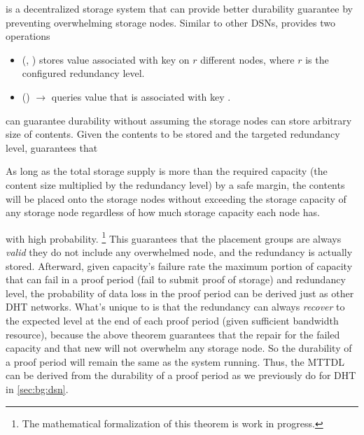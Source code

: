 \iffalse
\dht is a decentralized storage system that can provide better durability guarantee by preventing overwhelming storage nodes.
Similar to other DSNs, \dht provides two operations
\begin{itemize}
    \item \fput(, ) stores value  associated with key  on $r$ different nodes, where $r$ is the configured redundancy level.
    \item \fget() $\to$  queries value that is associated with key .
\end{itemize}
\noindent \dht can guarantee durability without assuming the storage nodes can store arbitrary size of contents.
Given the contents to be stored and the targeted redundancy level, \dht guarantees that
\begin{theorem}
    As long as the total storage supply is more than the required capacity (\ie the content size multiplied by the redundancy level) by a safe margin, the contents will be placed onto the storage nodes without exceeding the storage capacity of any storage node regardless of how much storage capacity each node has.
\end{theorem}
\noindent with high probability.
\footnote{The mathematical formalization of this theorem is work in progress.}
This guarantees that the placement groups are always \emph{valid} \ie they do not include any overwhelmed node, and the redundancy is actually stored.
Afterward, given capacity's failure rate \ie the maximum portion of capacity that can fail in a proof period (\ie fail to submit proof of storage) and redundancy level, the probability of data loss in the proof period can be derived just as other DHT networks.
What's unique to \dht is that the redundancy can always \emph{recover} to the expected level at the end of each proof period (given sufficient bandwidth resource), because the above theorem guarantees that the repair for the failed capacity and that new \fput will not overwhelm any storage node.
So the durability of a proof period will remain the same as the system running.
Thus, the MTTDL can be derived from the durability of a proof period as we previously do for DHT in \autoref{sec:bg:dsn}.

